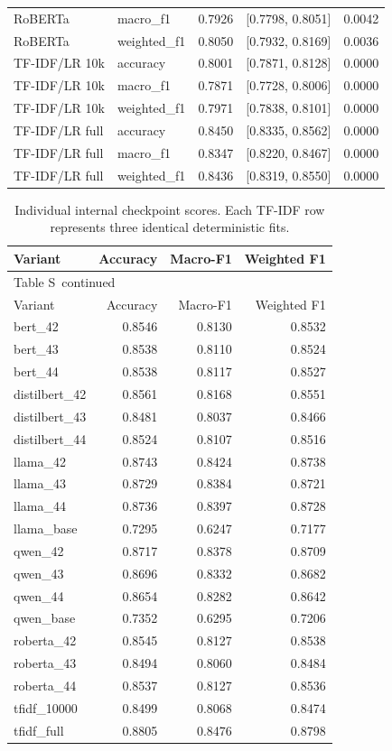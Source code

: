 \documentclass[10pt,a4paper]{article}
\renewcommand{\thetable}{S\arabic{table}}
\begin{document}
{\begin{longtable}{@{}llrrr@{}}
RoBERTa & macro\_f1 & 0.7926 & [0.7798, 0.8051] & 0.0042 \\
RoBERTa & weighted\_f1 & 0.8050 & [0.7932, 0.8169] & 0.0036 \\
TF-IDF/LR 10k & accuracy & 0.8001 & [0.7871, 0.8128] & 0.0000 \\
TF-IDF/LR 10k & macro\_f1 & 0.7871 & [0.7728, 0.8006] & 0.0000 \\
TF-IDF/LR 10k & weighted\_f1 & 0.7971 & [0.7838, 0.8101] & 0.0000 \\
TF-IDF/LR full & accuracy & 0.8450 & [0.8335, 0.8562] & 0.0000 \\
TF-IDF/LR full & macro\_f1 & 0.8347 & [0.8220, 0.8467] & 0.0000 \\
TF-IDF/LR full & weighted\_f1 & 0.8436 & [0.8319, 0.8550] & 0.0000 \\
\end{longtable}
}


{\small
\setlength{\tabcolsep}{4pt}
\begin{longtable}{@{}lrrr@{}}
\caption{Individual internal checkpoint scores. Each TF-IDF row represents three identical deterministic fits.}\label{sup:seeds-internal}\\
\toprule
Variant & Accuracy & Macro-F1 & Weighted F1 \\
\midrule\endfirsthead
\multicolumn{4}{l}{\small Table \thetable\ continued}\\
\toprule
Variant & Accuracy & Macro-F1 & Weighted F1 \\
\midrule\endhead
\bottomrule\endfoot
bert\_42 & 0.8546 & 0.8130 & 0.8532 \\
bert\_43 & 0.8538 & 0.8110 & 0.8524 \\
bert\_44 & 0.8538 & 0.8117 & 0.8527 \\
distilbert\_42 & 0.8561 & 0.8168 & 0.8551 \\
distilbert\_43 & 0.8481 & 0.8037 & 0.8466 \\
distilbert\_44 & 0.8524 & 0.8107 & 0.8516 \\
llama\_42 & 0.8743 & 0.8424 & 0.8738 \\
llama\_43 & 0.8729 & 0.8384 & 0.8721 \\
llama\_44 & 0.8736 & 0.8397 & 0.8728 \\
llama\_base & 0.7295 & 0.6247 & 0.7177 \\
qwen\_42 & 0.8717 & 0.8378 & 0.8709 \\
qwen\_43 & 0.8696 & 0.8332 & 0.8682 \\
qwen\_44 & 0.8654 & 0.8282 & 0.8642 \\
qwen\_base & 0.7352 & 0.6295 & 0.7206 \\
roberta\_42 & 0.8545 & 0.8127 & 0.8538 \\
roberta\_43 & 0.8494 & 0.8060 & 0.8484 \\
roberta\_44 & 0.8537 & 0.8127 & 0.8536 \\
tfidf\_10000 & 0.8499 & 0.8068 & 0.8474 \\
tfidf\_full & 0.8805 & 0.8476 & 0.8798 \\
\end{longtable}
}
\end{document}
